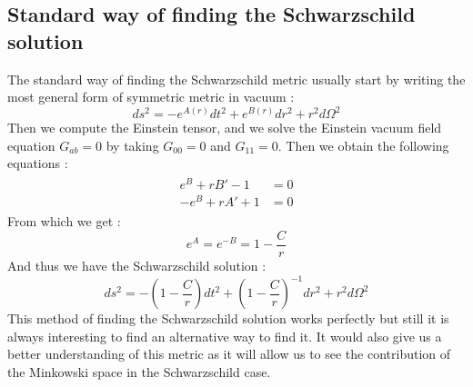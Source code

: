 \documentclass[a4paper,12pt]{article}
\theoremstyle{definition}
\begin{document}
\subsection{Standard way of finding the Schwarzschild solution}
The standard way of finding the Schwarzschild metric usually start by writing the most general form of symmetric metric in vacuum :
\begin{equation}
	ds^2=-e^{A(r)}dt^2+e^{B(r)}dr^2+r^2d\Omega^2
\end{equation}
Then we compute the Einstein tensor, and we solve the Einstein vacuum field equation $G_{ab}=0$ by taking $G_{00}=0$ and $G_{11}=0$.
Then we obtain the following equations :
\begin{align}
\begin{split}
	e^B+rB'-1&=0\\
	-e^B+rA'+1&=0
\end{split}
\end{align}
From which we get :
\begin{equation}
	e^A=e^{-B}=1-\frac{C}{r}
\end{equation}
And thus we have the Schwarzschild solution :
\begin{equation}
	ds^2=-(1-\frac{C}{r})dt^2+(1-\frac{C}{r})^{-1}dr^2+r^2d\Omega^2
\end{equation}
This method of finding the Schwarzschild solution works perfectly but still it is always interesting to find an alternative way to find it.
It would also give us a better understanding of this metric as it will allow us to see the contribution of the Minkowski space in the Schwarzschild case.
\end{document}

